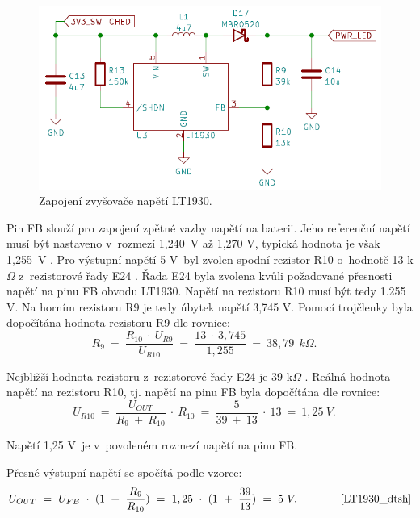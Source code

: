 \begin{figure}[!h]
  \begin{center}
    \includegraphics[scale=0.6]{obrazky/LT1930.png}
  \end{center}
  \caption[Zapojení zvyšovače napětí LT1930]{Zapojení zvyšovače napětí LT1930.}
\end{figure}

Pin FB slouží  pro zapojení zpětné vazby napětí na baterii. Jeho referenční napětí musí být nastaveno v~rozmezí 1,240~V až 1,270 V, typická hodnota je však 1,255~V \cite{LT1930_dtsh}. 
Pro výstupní napětí 5 V~byl zvolen spodní rezistor R10 o~hodnotě 13 k$\Omega$ z~rezistorové řady E24 \cite{rezistorova_rada}. Řada E24 byla zvolena kvůli požadované přesnosti
napětí na pinu FB obvodu LT1930. Napětí na rezistoru R10 musí být tedy 1.255 V. Na horním rezistoru R9 je tedy úbytek napětí 3,745 V. Pomocí trojčlenky byla dopočítána hodnota 
rezistoru R9 dle rovnice:
\begin{equation} 
  R_{9}~=~\frac{R_{10}~\cdot~U_{R9}}{U_{R10}}~=~\frac{13~\cdot~3,745}{1,255}~=~38,79~\:k\Omega. 
  \quad
\label{eq:R9}
\end{equation}

Nejbližší hodnota rezistoru z~rezistorové řady E24 je 39 k$\Omega$ \cite{rezistorova_rada}. Reálná hodnota napětí na rezistoru R10, tj. napětí na pinu FB byla dopočítána
dle rovnice:
\begin{equation} 
  U_{R10}~=~\frac{U_{OUT}}{R_{9}~+~R_{10}}~\cdot~R_{10}~=~\frac{5}{39~+~13}~\cdot~13~=~1,25~V. 
  \quad
\label{eq:UR10}
\end{equation}

Napětí 1,25 V~je v~povoleném rozmezí napětí na pinu FB. 

Přesné výstupní napětí se spočítá podle vzorce:
\begin{equation} 
  U_{OUT}~=~U_{FB}~\cdot~(1~+~\frac{R_{9}}{R_{10}})~=~1,25~\cdot~(1~+~\frac{39}{13})~=~5~V. 
  \quad \quad \quad \quad \cite{LT1930_dtsh}
\label{eq:VOUT_LT1930}
\end{equation}

